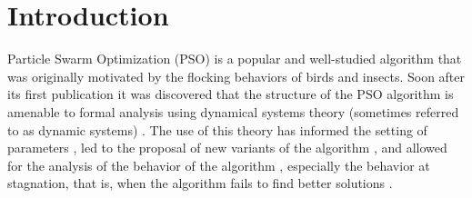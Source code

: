 \documentclass{sig-alternate}
\begin{document}

\section{Introduction}
\label{sec:intro}
Particle Swarm Optimization (PSO) is a popular and well-studied algorithm that was originally motivated by the flocking behaviors of birds and insects.
Soon after its first publication it was discovered that the structure of the PSO algorithm is amenable to formal analysis using dynamical systems theory (sometimes referred to as dynamic systems) \cite{985692}.
The use of this theory has informed the setting of parameters \cite{Trelea2003317,Jiang20078}, led to the proposal of new variants of the algorithm \cite{985692}, and allowed for the analysis of the behavior of the algorithm \cite{Schmitt:2013:PSO:2463372.2463563}, especially the behavior at stagnation, that is, when the algorithm fails to find better solutions \cite{985692}.
\end{document}
